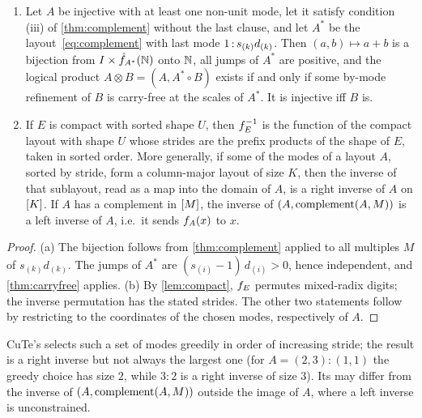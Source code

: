 \begin{proposition}\label{prop:product}
\begin{enumerate}[label=(\alph*),itemsep=1pt]
\item Let $A$ be injective with at least one non-unit mode, let it satisfy condition (iii) of
 \cref{thm:complement} without the last clause, and let $A^*$ be the layout~\eqref{eq:complement}
 with last mode $1\,{:}\,s_{(k)}d_{(k)}$. Then $(a,b)\mapsto a+b$ is a bijection from
 $I\times\hat{f}_{A^*}(\mathbb{N})$ onto $\mathbb{N}$, all jumps of $A^*$ are positive, and the logical product
 $A\otimes B=(A,A^*\circ B)$ exists if and only if some by-mode refinement of $B$ is carry-free at
 the scales of $A^*$. It is injective iff $B$ is.
\item If $E$ is compact with sorted shape $U$, then $f_{E}^{-1}$ is the function of the compact
 layout with shape $U$ whose strides are the prefix products of the shape of $E$, taken in sorted
 order. More generally, if some of the modes of a layout $A$, sorted by stride, form a
 column-major layout of size $K$, then the inverse of that sublayout, read as a map into the
 domain of $A$, is a right inverse of $A$ on $[K]$. If $A$ has a complement in $[M]$, the
 inverse of $(A,\operatorname{complement}(A,M))$ is a left inverse of $A$, i.e.\ it sends $f_{A}(x)$ to $x$.
\end{enumerate}
\end{proposition}
\begin{proof}
(a) The bijection follows from \cref{thm:complement} applied to all multiples $M$ of
$s_{(k)}d_{(k)}$. The jumps of $A^*$ are $(s_{(i)}-1)\,d_{(i)}>0$, hence independent, and
\cref{thm:carryfree} applies. (b) By \cref{lem:compact}, $f_{E}$ permutes mixed-radix digits; the
inverse permutation has the stated strides. The other two statements follow by restricting to
the coordinates of the chosen modes, respectively of $A$.
\end{proof}

\noindent CuTe's  selects such a set of modes greedily in order of
increasing stride; the result is a right inverse but not always the largest one (for
$A=(2,3):(1,1)$ the greedy choice has size $2$, while $3:2$ is a right inverse of size $3$).
Its  may differ from the inverse of $(A,\operatorname{complement}(A,M))$ outside the image of
$A$, where a left inverse is unconstrained.
